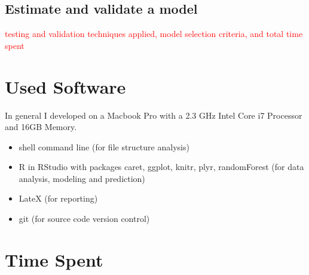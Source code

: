 \documentclass{article}
\begin{document}

\subsection{Estimate and validate a model}
\label{sub_estimate_and_validate_a_model}

\textcolor{red}{testing and validation techniques applied, model selection criteria, and total time spent}



\section{Used Software}
\label{used_software}
In general I developed on a Macbook Pro with a 2.3 GHz Intel Core i7 Processor and 16GB Memory.

\begin{itemize}
	\item shell command line (for file structure analysis)
	\item R in RStudio with packages caret, ggplot, knitr, plyr, randomForest (for data analysis, modeling and prediction)
	\item LateX (for reporting)
	\item git (for source code version control)
\end{itemize}

\section{Time Spent}
\end{document}

